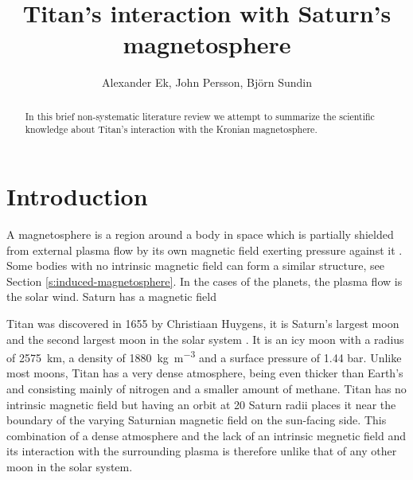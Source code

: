 \documentclass[12pt, parskip=full*, abstract]{scrartcl}
\title{Titan's interaction with Saturn's magnetosphere}
\author{Alexander Ek, John Persson, Björn Sundin}
\begin{document}
\maketitle
\vspace{5mm}
\begin{abstract}
	In this brief non-systematic literature review we attempt to summarize the scientific knowledge about Titan's interaction with the Kronian magnetosphere.
\end{abstract}

\newpage
\tableofcontents
\newpage

\section{Introduction}

A magnetosphere is a region around a body in space which is partially shielded from external plasma flow by its own magnetic field exerting pressure against it \parencite{encyclopedia-magnetospheres}. Some bodies with no intrinsic magnetic field can form a similar structure, see Section \ref{s:induced-magnetosphere}. In the cases of the planets, the plasma flow is the solar wind. Saturn has a magnetic field 





Titan was discovered in 1655 by Christiaan Huygens, it is Saturn's largest moon and the second largest moon in the solar system \parencite{fundamental-planetary-science}. It is an icy moon with a radius of \SI{2575}{\kilo\metre}, a density of \SI{1880}{\kilogram\per\metre^3} and a surface pressure of 1.44 bar. Unlike most moons, Titan has a very dense atmosphere, being even thicker than Earth's and consisting mainly of nitrogen and a smaller amount of methane. Titan has no intrinsic magnetic field but having an orbit at 20 Saturn radii places it near the boundary of the varying Saturnian magnetic field on the sun-facing side. This combination of a dense atmosphere and the lack of an intrinsic megnetic field and its interaction with the surrounding plasma is therefore unlike that of any other moon in the solar system. 
\end{document}
